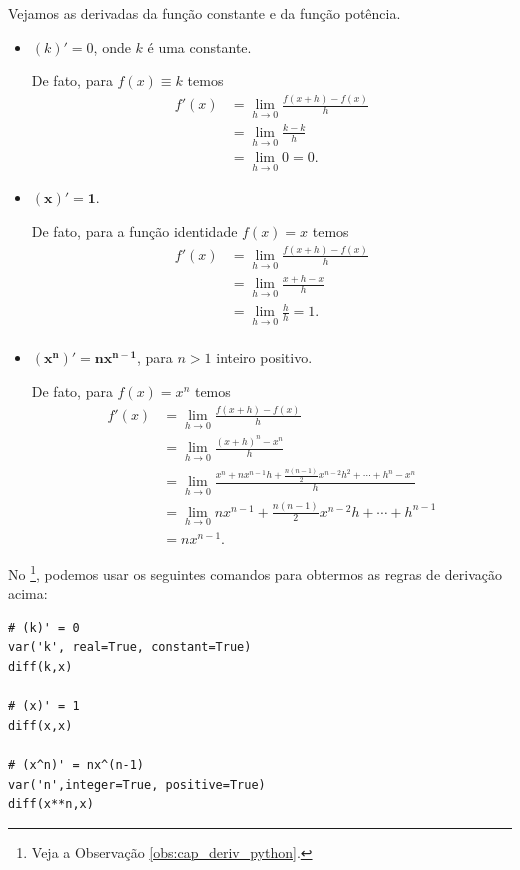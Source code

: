 Vejamos as derivadas da função constante e da função potência.
\begin{itemize}
\item $(k)' = 0$, onde $k$ é uma constante.

  De fato, para $f(x) \equiv k$ temos
  \begin{align}
    f'(x) &= \lim_{h\to 0} \frac{f(x+h)-f(x)}{h}\\
          &= \lim_{h\to 0} \frac{k-k}{h} \\
          &= \lim_{h\to 0} 0 = 0.
  \end{align}

\item $\pmb{(x)' = 1}$.

  De fato, para a função identidade $f(x) = x$ temos
  \begin{align}
    f'(x) &= \lim_{h\to 0} \frac{f(x+h)-f(x)}{h}\\
          &= \lim_{h\to 0} \frac{x+h-x}{h}\\
          &= \lim_{h\to 0} \frac{h}{h} = 1.\\
  \end{align}

\item $\pmb{(x^n)' = nx^{n-1}}$, para $n > 1$ inteiro positivo.

  De fato, para $f(x) = x^n$ temos
  \begin{align}
    f'(x) &= \lim_{h\to 0} \frac{f(x+h)-f(x)}{h}\\
          &= \lim_{h\to 0} \frac{(x+h)^n-x^n}{h} \\
          &= \lim_{h\to 0} \frac{x^n+nx^{n-1}h+\frac{n(n-1)}{2}x^{n-2}h^2 + \cdots +h^n-x^n}{h}\\
          &= \lim_{h\to 0} nx^{n-1}+\frac{n(n-1)}{2}x^{n-2}h+\cdots+h^{n-1}\\
          &= nx^{n-1}.
  \end{align}
\end{itemize}

\ifispython
No \sympy\footnote{Veja a Observação \ref{obs:cap_deriv_python}.}, podemos usar os seguintes comandos para obtermos as regras de derivação acima:
\begin{verbatim}
# (k)' = 0
var('k', real=True, constant=True)
diff(k,x)

# (x)' = 1
diff(x,x)

# (x^n)' = nx^(n-1)
var('n',integer=True, positive=True)
diff(x**n,x)
\end{verbatim}
\fi

